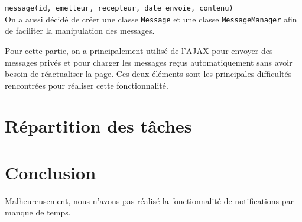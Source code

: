 \documentclass[a4paper, 12pt]{article}
\begin{document}
 \texttt{message(id, emetteur, recepteur, date\_envoie, contenu)}\\		
On a aussi décidé de créer une classe \texttt{Message} et une classe \texttt{MessageManager} afin de faciliter la manipulation des messages. 

\vspace{2\baselineskip}

Pour cette partie, on a principalement utilisé de l'AJAX pour envoyer des messages privés et pour charger les messages reçus automatiquement sans avoir besoin de réactualiser la page. Ces deux éléments sont les principales difficultés rencontrées pour réaliser cette fonctionnalité.


\newpage		
\section{Répartition des tâches}
	
			
\section{Conclusion}			
Malheureusement, nous n'avons pas réalisé la fonctionnalité de notifications par manque de temps.
\end{document}
